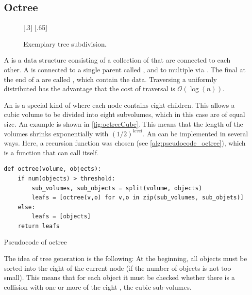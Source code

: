 \subsection{Octree}
%
\begin{figure}[!t]
    \centering
    [.3\textwidth]{
    \def\tikzheight{0.6\textwidth}
    }
    \hfill
    [.65\textwidth]{
    \def\tikzheight{0.6\textwidth}
    }
	\caption{Exemplary tree subdivision.}
	\label{fig:octree}
\end{figure}
%
A  is a data structure consisting of a collection of  that are connected to each other.
A  is connected to a single parent  called , and to multiple  via .
The final  at the end of a  are called , which contain the data.
Traversing a uniformly distributed  has the advantage that the cost of traversal is $\mathcal{O}(\log(n))$.
\par
%
An  is a special kind of  where each node contains eight children.
This allows a cubic volume to be divided into eight subvolumes, which in this case are of equal size.
An example is shown in \cref{fig:octreeCube}.
This means that the length of the volumes shrinks exponentially with $(1/2)^\mathit{level}$.
An  can be implemented in several ways.
Here, a recursion function was chosen (see \cref{alg:pseudocode_octree}), which is a function that can call itself.
%
\begin{lstfloat}[!tb]
\lstset{style=python}
\begin{lstlisting}[]
def octree(volume, objects):
    if num(objects) > threshold:
        sub_volumes, sub_objects = split(volume, objects)
        leafs = [octree(v,o) for v,o in zip(sub_volumes, sub_objets)]
    else:
        leafs = [objects]
    return leafs
\end{lstlisting}
\caption{Pseudocode of octree}
\label{alg:pseudocode_octree}
\end{lstfloat}
%
The idea of tree generation is the following:
At the beginning, all objects must be sorted into the eight  of the current node (if the number of objects is not too small).
This means that for each object it must be checked whether there is a collision with one or more of the eight , \ie{} the cubic sub-volumes.
